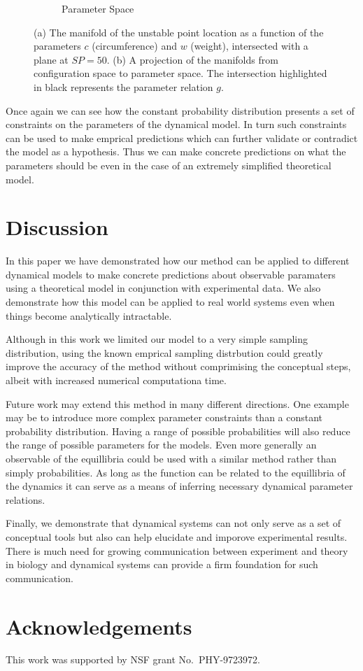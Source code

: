 \documentclass[letterpaper]{article}
\begin{document}
\begin{figure}
\begin{subfigure}[b]{0.3\textwidth}
            \caption[]%
            {{\small Parameter Space}}    
            \label{fig:mean and std of net24}
        \end{subfigure}
    \caption{(a) The manifold of the unstable point location as a function of
    the parameters $c$ (circumference) and $w$ (weight), intersected with a plane 
    at $SP=50$.
    (b) A projection of the manifolds from configuration space to parameter space.
    The intersection highlighted in black represents the parameter relation $g$.}
    \label{worm_sp}
    \end{figure}

Once again we can see how the constant probability distribution presents a set of 
constraints on the parameters of the dynamical model. In turn such constraints can
be used to make emprical predictions which can further validate or contradict the
model as a hypothesis. Thus we can make concrete predictions on what the parameters
should be even in the case of an extremely simplified theoretical model.

\section{Discussion}
In this paper we have demonstrated how our method can be applied to different
dynamical models to make concrete predictions about observable paramaters using 
a theoretical model in conjunction with experimental data. We also demonstrate
how this model can be applied to real world systems even when things become 
analytically intractable.

Although in this work we limited our model to a very simple sampling distribution,
using the known emprical sampling distrbution could greatly improve the accuracy of
the method without comprimising the conceptual steps, albeit with increased numerical
computationa time.

Future work may extend this method in many different directions. One example may 
be to introduce more complex parameter constraints than a constant probability
distribution. Having a range of possible probabilities will also reduce the
range of possible parameters for the models. Even more generally an observable
of the equillibria could be used with a similar method rather than simply
probabilities. As long as the function can be related to the equillibria of the
dynamics it can serve as a means of inferring necessary dynamical parameter relations.

Finally, we demonstrate that dynamical systems can not only serve as a set of conceptual
tools but also can help elucidate and imporove experimental results. There is much need
for growing communication between experiment and theory in biology and dynamical systems
can provide a firm foundation for such communication.
\section{Acknowledgements}

This work was supported by NSF grant No.\ PHY-9723972.

\footnotesize

\end{document}
